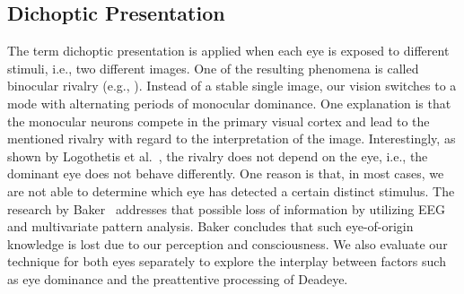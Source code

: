 \documentclass[journal]{vgtc}                %
\begin{document}
%







\subsection{Dichoptic Presentation}


The term dichoptic presentation is applied when each eye is exposed to different stimuli, i.e., two different images. One of the resulting phenomena is called binocular rivalry (e.g., \cite{logothetis1996rivalling, blake1989neural, friedenberg2012visual, alais2005binocular, Paffen2011}). Instead of a stable single image, our vision switches to a mode with alternating periods of monocular dominance. One explanation is that the monocular neurons compete in the primary visual cortex and lead to the mentioned rivalry with regard to the interpretation of the image. Interestingly, as shown by Logothetis et al.~\cite{logothetis1996rivalling}, the rivalry does not depend on the eye, i.e., the dominant eye does not behave differently. One reason is that, in most cases, we are not able to determine which eye has detected a certain distinct stimulus. The research by Baker~\cite{baker2017decoding} addresses that possible loss of information by utilizing EEG and multivariate pattern analysis. Baker concludes that such eye-of-origin knowledge is lost due to our perception and consciousness. We also evaluate our technique for both eyes separately to explore the interplay between factors such as eye dominance and the preattentive processing of Deadeye.
\end{document}
